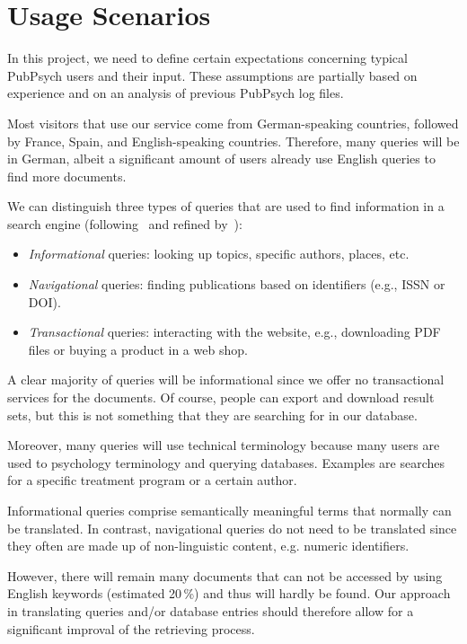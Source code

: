 \documentclass[a4paper,11pt]{article}
\begin{document}
\section{Usage Scenarios}
\label{s:usage_scenarios}
In this project, we need to define certain expectations concerning typical PubPsych users and their input. These assumptions are partially based on experience and on an analysis of previous PubPsych log files.

Most visitors that use our service come from German-speaking countries, followed by France, Spain, and English-speaking countries. Therefore, many queries will be in German, albeit a significant amount of users already use English queries to find more documents.

We can distinguish three types of queries that are used to find information in a search engine (following~\cite{broder:2002} and refined by~\cite{liEtal:2017}):
\begin{itemize}
	\item{\textit{Informational} queries: looking up topics, specific authors, places, etc.}
	\item{\textit{Navigational} queries: finding publications based on identifiers (e.g., ISSN or DOI).}
	\item{\textit{Transactional} queries: interacting with the website, e.g., downloading PDF files or buying a product in a web shop.}
\end{itemize}

A clear majority of queries will be informational since we offer no transactional services for the documents. Of course, people can export and download result sets, but this is not something that they are searching for in our database. 

Moreover, many queries will use technical terminology because many users are used to psychology terminology and querying databases. Examples are searches for a specific treatment program or a certain author.

Informational queries comprise semantically meaningful terms that normally can be translated. In contrast, navigational queries do not need to be translated since they often are made up of non-linguistic content, e.g. numeric identifiers.

However, there will remain many documents that can not be accessed by using English keywords (estimated 20\,\%) and thus will hardly be found. Our approach in translating queries and/or database entries should therefore allow for a significant improval of the retrieving process.
\end{document}
